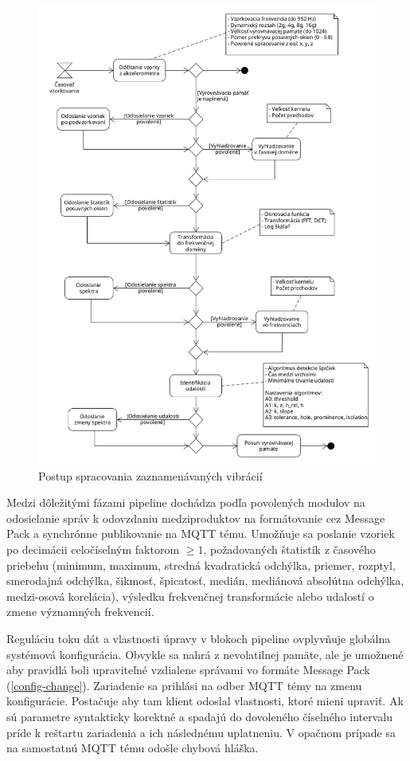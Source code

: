 \begin{figure}[h!]
	\centering
	\includegraphics[width=\textwidth]{figures/design/pipeline.png}
	\caption{Postup spracovania zaznamenávaných vibrácií}
	\label{pipeline}
\end{figure}

Medzi dôležitými fázami pipeline dochádza podľa povolených modulov na odosielanie správ k odovzdaniu medziproduktov na formátovanie
cez Message Pack a synchrónne publikovanie na MQTT tému. Umožňuje sa poslanie vzoriek po decimácii celočíselným faktorom $\geq 1$,
požadovaných štatistík z časového priebehu (minimum, maximum, stredná kvadratická odchýlka, priemer, rozptyl, smerodajná odchýlka,
šikmosť, špicatosť, medián, mediánová absolútna odchýlka, medzi-osová korelácia), výsledku frekvenčnej transformácie alebo udalostí
o zmene významných frekvencií.

Reguláciu toku dát a vlastnosti úpravy v blokoch pipeline ovplyvňuje globálna systémová konfigurácia. Obvykle sa nahrá
z nevolatilnej pamäte, ale je umožnené aby pravidlá boli upraviteľné vzdialene správami vo formáte Message Pack (\ref{config-change}).
Zariadenie sa prihlási na odber MQTT témy na zmenu konfigurácie. Postačuje aby tam klient odoslal vlastnosti, ktoré mieni
upraviť. Ak sú parametre syntakticky korektné a spadajú do dovoleného číselného intervalu príde k reštartu zariadenia a ich
následnému uplatneniu. V opačnom prípade sa na samostatnú MQTT tému odošle chybová hláška.

